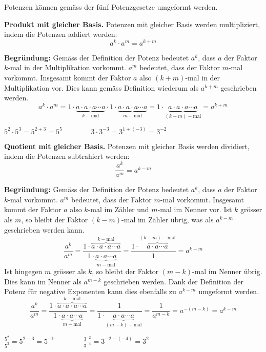Potenzen können gemäss der fünf Potenzgesetze umgeformt werden.
\begin{theorem}
  \textbf{Produkt mit gleicher Basis.} Potenzen mit gleicher Basis werden multipliziert, indem die Potenzen addiert werden:
  \[
    a^{k} \cdot a^{m} = a^{k+m}
  \]
\end{theorem}
\textbf{Begründung:} Gemäss der Definition der Potenz bedeutet $a^{k}$, dass $a$ der Faktor $k$-mal in der Multiplikation vorkommt. $a^{m}$ bedeutet, dass der Faktor $m$-mal vorkommt. Insgesamt kommt der Faktor $a$ also $(k+m)$-mal in der Multiplikation vor. Dies kann gemäss Definition wiederum als $a^{k+m}$ geschrieben werden.
\[
  a^{k}\cdot a^{m} = 1\cdot\underbrace{a\cdot a\cdot a\cdots a}_{k-\text{mal}}\cdot 1\cdot\underbrace{a\cdot a\cdot a\cdots a}_{m-\text{mal}} = 1\cdot\underbrace{a\cdot a\cdot a\cdots a}_{(k+m)-\text{mal}} = a^{k+m}
\]
\begin{example}
  $\displaystyle 5^{2}\cdot 5^{3} = 5^{2+3} = 5^{5} \qquad\qquad 3\cdot 3^{-3} = 3^{1+(-3)} = 3^{-2}$
\end{example}
\vspace{1cm}
\begin{theorem}
  \textbf{Quotient mit gleicher Basis.} Potenzen mit gleicher Basis werden dividiert, indem die Potenzen subtrahiert werden:
  \[
    \frac{a^{k}}{a^{m}} = a^{k-m}
  \]
\end{theorem}
\textbf{Begründung:} Gemäss der Definition der Potenz bedeutet $a^{k}$, dass $a$ der Faktor $k$-mal vorkommt. $a^{m}$ bedeutet, dass der Faktor $m$-mal vorkommt. Insgesamt kommt der Faktor $a$ also $k$-mal im Zähler und $m$-mal im Nenner vor. Ist $k$ grösser als $m$, so bleibt der Faktor $(k-m)$-mal im Zähler übrig, was als $a^{k-m}$ geschrieben werden kann.
\[
  \frac{a^{k}}{a^{m}} = \frac{1\cdot\overbrace{a\cdot a\cdot a\cdots a}^{k-\text{mal}}}{1\cdot\underbrace{a\cdot a\cdots a}_{m-\text{mal}}} = \frac{1\cdot\overbrace{a\cdot a\cdots a}^{(k-m)-\text{mal}}}{1} = a^{k-m}
\]
Ist hingegen $m$ grösser als $k$, so bleibt der Faktor $(m-k)$-mal im Nenner übrig. Dies kann im Nenner als $a^{m-k}$ geschrieben werden. Dank der Definition der Potenz für negative Exponenten kann dies ebenfalls zu $a^{k-m}$ umgeformt werden.
\[
  \frac{a^{k}}{a^{m}} = \frac{1\cdot\overbrace{a\cdot a\cdot a\cdots a}^{k-\text{mal}}}{1\cdot\underbrace{a\cdot a\cdots a}_{m-\text{mal}}} = \frac{1}{1\cdot\underbrace{a\cdot a\cdots a}_{(m-k)-\text{mal}}} = \frac{1}{a^{m-k}} = a^{-(m-k)} = a^{k-m}
\]
\begin{example}
  $\displaystyle \frac{5^{2}}{5^{3}} = 5^{2-3} = 5^{-1} \qquad\qquad \frac{3^{-2}}{3^{-4}} = 3^{-2-(-4)} = 3^{2}$
\end{example}
